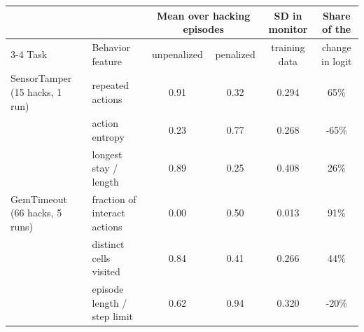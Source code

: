 \begin{tabular}{@{}llcccc@{}}
\toprule
& & \multicolumn{2}{c}{Mean over hacking episodes} & SD in monitor & Share of the \\
\cmidrule(lr){3-4}
Task & Behavior feature & unpenalized & penalized & training data & change in logit \\
\midrule
SensorTamper (15 hacks, 1 run) & repeated actions & 0.91 & 0.32 & 0.294 & 65\% \\
 & action entropy & 0.23 & 0.77 & 0.268 & -65\% \\
 & longest stay / length & 0.89 & 0.25 & 0.408 & 26\% \\
\midrule
GemTimeout (66 hacks, 5 runs) & fraction of interact actions & 0.00 & 0.50 & 0.013 & 91\% \\
 & distinct cells visited & 0.84 & 0.41 & 0.266 & 44\% \\
 & episode length / step limit & 0.62 & 0.94 & 0.320 & -20\% \\
\bottomrule
\end{tabular}
